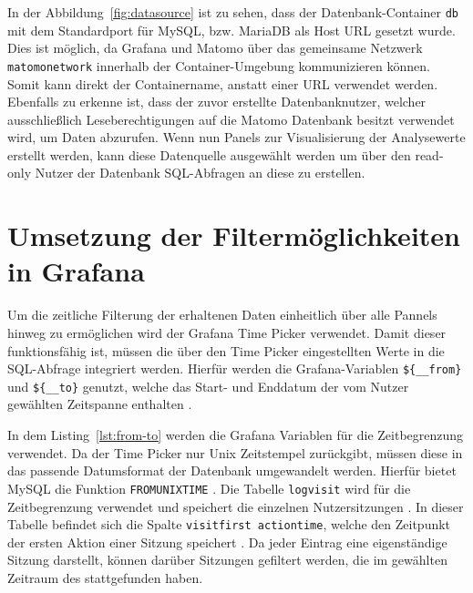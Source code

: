 In der Abbildung~\ref{fig:datasource} ist zu sehen, dass der Datenbank-Container \texttt{db} mit dem Standardport für MySQL, bzw. MariaDB als Host URL gesetzt wurde. Dies ist möglich, da Grafana und Matomo über das gemeinsame Netzwerk \texttt{matomo\textunderscore network} innerhalb der Container-Umgebung kommunizieren können. Somit kann direkt der Containername, anstatt einer URL verwendet werden. Ebenfalls zu erkenne ist, dass der zuvor erstellte Datenbanknutzer, welcher ausschließlich Leseberechtigungen auf die Matomo Datenbank besitzt verwendet wird, um Daten abzurufen. Wenn nun Panels zur Visualisierung der Analysewerte erstellt werden, kann diese Datenquelle ausgewählt werden um über den read-only Nutzer der Datenbank SQL-Abfragen an diese zu erstellen.

\section{Umsetzung der Filtermöglichkeiten in Grafana}
Um die zeitliche Filterung der erhaltenen Daten einheitlich über alle Pannels hinweg zu ermöglichen wird der Grafana Time Picker verwendet. Damit dieser funktionsfähig ist, müssen die über den Time Picker eingestellten Werte in die SQL-Abfrage integriert werden. Hierfür werden die Grafana-Variablen \texttt{\$\{\_\_from\}} und \texttt{\$\{\_\_to\}} genutzt, welche das Start- und Enddatum der vom Nutzer gewählten Zeitspanne enthalten \parencite{GrafanaTimePickerVariables}. 

\begin{figure}[H]
    \centering
    \begin{minipage}{\textwidth}
        
    \end{minipage}
\end{figure}

In dem Listing~\ref{lst:from-to} werden die Grafana Variablen für die Zeitbegrenzung verwendet. Da der Time Picker nur Unix Zeitstempel zurückgibt, müssen diese in das passende Datumsformat der Datenbank umgewandelt werden. Hierfür bietet MySQL die Funktion \texttt{FROM\textunderscore UNIXTIME} \parencite{MySQLUnixtime}. Die Tabelle \texttt{log\textunderscore visit} wird für die Zeitbegrenzung verwendet und speichert die einzelnen Nutzersitzungen \parencite{MatomoDBSchema}. In dieser Tabelle befindet sich die Spalte \texttt{visit\textunderscore first \textunderscore action\textunderscore time}, welche den Zeitpunkt der ersten Aktion einer Sitzung speichert \parencite{MatomoDBSchema}. Da jeder Eintrag eine eigenständige Sitzung darstellt, können darüber Sitzungen gefiltert werden, die im gewählten Zeitraum des stattgefunden haben.

